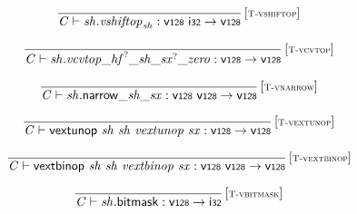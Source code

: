 $$
\begin{array}{@{}c@{}}\displaystyle
\frac{
}{
{\mathit{C}} \vdash {\mathit{sh}} . {\mathit{vshiftop}}_{{\mathit{sh}}} : \mathsf{v{\scriptstyle128}}~\mathsf{i{\scriptstyle32}} \rightarrow \mathsf{v{\scriptstyle128}}
} \, {[\textsc{\scriptsize T{-}vshiftop}]}
\qquad
\end{array}
$$

$$
\begin{array}{@{}c@{}}\displaystyle
\frac{
}{
{\mathit{C}} \vdash {\mathit{sh}} . {{{{{{{{{\mathit{vcvtop}}}{\mathsf{\_}}}{{{\mathit{hf}}^?}}}{\mathsf{\_}}}{{\mathit{sh}}}}{\mathsf{\_}}}{{{\mathit{sx}}^?}}}{\mathsf{\_}}}{{\mathit{zero}}} : \mathsf{v{\scriptstyle128}} \rightarrow \mathsf{v{\scriptstyle128}}
} \, {[\textsc{\scriptsize T{-}vcvtop}]}
\qquad
\end{array}
$$

$$
\begin{array}{@{}c@{}}\displaystyle
\frac{
}{
{\mathit{C}} \vdash {{{{{\mathit{sh}}.\mathsf{narrow}}{\mathsf{\_}}}{{\mathit{sh}}}}{\mathsf{\_}}}{{\mathit{sx}}} : \mathsf{v{\scriptstyle128}}~\mathsf{v{\scriptstyle128}} \rightarrow \mathsf{v{\scriptstyle128}}
} \, {[\textsc{\scriptsize T{-}vnarrow}]}
\qquad
\end{array}
$$

$$
\begin{array}{@{}c@{}}\displaystyle
\frac{
}{
{\mathit{C}} \vdash \mathsf{vextunop}~{\mathit{sh}}~{\mathit{sh}}~{\mathit{vextunop}}~{\mathit{sx}} : \mathsf{v{\scriptstyle128}} \rightarrow \mathsf{v{\scriptstyle128}}
} \, {[\textsc{\scriptsize T{-}vextunop}]}
\qquad
\end{array}
$$

$$
\begin{array}{@{}c@{}}\displaystyle
\frac{
}{
{\mathit{C}} \vdash \mathsf{vextbinop}~{\mathit{sh}}~{\mathit{sh}}~{\mathit{vextbinop}}~{\mathit{sx}} : \mathsf{v{\scriptstyle128}}~\mathsf{v{\scriptstyle128}} \rightarrow \mathsf{v{\scriptstyle128}}
} \, {[\textsc{\scriptsize T{-}vextbinop}]}
\qquad
\end{array}
$$

$$
\begin{array}{@{}c@{}}\displaystyle
\frac{
}{
{\mathit{C}} \vdash {\mathit{sh}}.\mathsf{bitmask} : \mathsf{v{\scriptstyle128}} \rightarrow \mathsf{i{\scriptstyle32}}
} \, {[\textsc{\scriptsize T{-}vbitmask}]}
\qquad
\end{array}
$$

\vspace{1ex}

